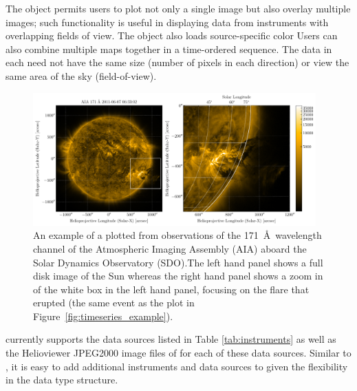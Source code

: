 The \Map object permits users to plot not only a single image but also overlay multiple images; such functionality is useful in displaying data from instruments with overlapping fields of view. The \Map object also loads source-specific color
Users can also combine multiple maps together in a time-ordered sequence. The data in each \Map need not have the same size (number of pixels in each direction) or view the same area of the sky (field-of-view). 

\begin{figure}
    \centering
    \includegraphics[width=0.97\textwidth]{figures/map_example.pdf}
    \caption{An example of a \sunpypkg \Map plotted from observations of the 171~\AA\ wavelength channel of the Atmospheric Imaging Assembly (AIA) aboard the Solar Dynamics Observatory (SDO).The left hand panel shows a full disk image of the Sun whereas the right hand panel shows a zoom in of the white box in the left hand panel, focusing on the flare that erupted (the same event as the \Timeseries plot in Figure~\ref{fig:timeseries_example}).}
    \label{fig:map_example}
\end{figure}

\Map currently supports the data sources listed in Table \ref{tab:instruments} as well as the Helioviewer JPEG2000 image files of for each of these data sources. Similar to \Timeseries, it is easy to add additional instruments and data sources to \Map given the flexibility in the data type structure. 
